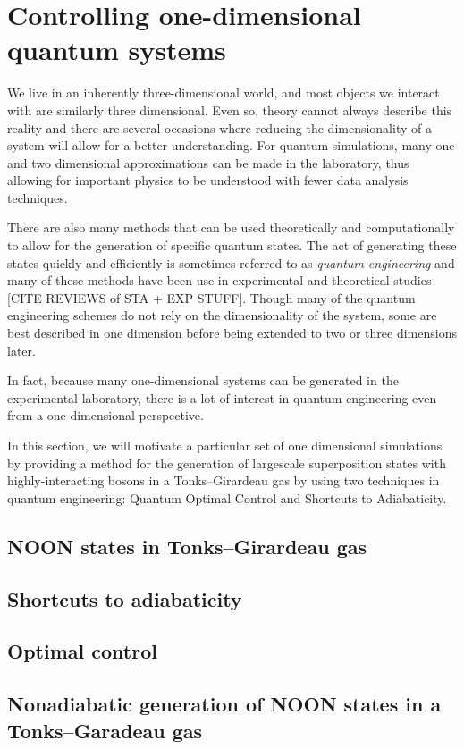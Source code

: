 \chapter{Controlling one-dimensional quantum systems}
\label{ch-1d}

We live in an inherently three-dimensional world, and most objects we interact with are similarly three dimensional.
Even so, theory cannot always describe this reality and there are several occasions where reducing the dimensionality of a system will allow for a better understanding.
For quantum simulations, many one and two dimensional approximations can be made in the laboratory, thus allowing for important physics to be understood with fewer data analysis techniques.

There are also many methods that can be used theoretically and computationally to allow for the generation of specific quantum states.
The act of generating these states quickly and efficiently is sometimes referred to as \textit{quantum engineering} and many of these methods have been use in experimental and theoretical studies [CITE REVIEWS of STA + EXP STUFF].
Though many of the quantum engineering schemes do not rely on the dimensionality of the system, some are best described in one dimension before being extended to two or three dimensions later.

In fact, because many one-dimensional systems can be generated in the experimental laboratory, there is a lot of interest in quantum engineering even from a one dimensional perspective.

In this section, we will motivate a particular set of one dimensional simulations by providing a method for the generation of largescale superposition states with highly-interacting bosons in a Tonks--Girardeau gas by using two techniques in quantum engineering: Quantum Optimal Control and Shortcuts to Adiabaticity.

\section{NOON states in Tonks--Girardeau gas}

\section{Shortcuts to adiabaticity}
\section{Optimal control}


\section{Nonadiabatic generation of NOON states in a Tonks--Garadeau gas}
